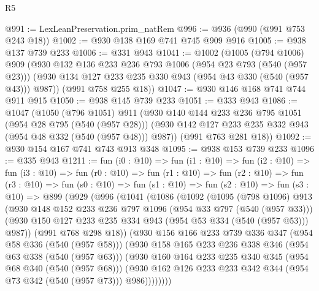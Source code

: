 \begin{lexlean}{R5}
\begin{coremodule}
@991 := LexLeanPreservation.prim_natRem
@996 := @936 (@990 (@991 @753 @243 @18))
@1002 := @930 @138 @169 @741 @745 @909 @916
@1005 := @938 @137 @739 @233
@1006 := @331 @943
@1041 := @1002
    (@1005
      (@794 @1006)
      @909
      (@930
        @132
        @136
        @233
        @236
        @793
        @1006
        (@954 @23 @793 (@540 (@957 @23)))
        (@930 @134 @127 @233 @235 @330 @943 (@954 @43 @330 (@540 (@957 @43))) @987))
      (@991 @758 @255 @18))
@1047 := @930 @146 @168 @741 @744 @911 @915
@1050 := @938 @145 @739 @233
@1051 := @333 @943
@1086 := @1047
    (@1050
      (@796 @1051)
      @911
      (@930
        @140
        @144
        @233
        @236
        @795
        @1051
        (@954 @28 @795 (@540 (@957 @28)))
        (@930 @142 @127 @233 @235 @332 @943 (@954 @48 @332 (@540 (@957 @48))) @987))
      (@991 @763 @281 @18))
@1092 := @930 @154 @167 @741 @743 @913 @348
@1095 := @938 @153 @739 @233
@1096 := @335 @943
@1211 := fun (i0 : @10) =>
  fun (i1 : @10) =>
  fun (i2 : @10) =>
  fun (i3 : @10) =>
  fun (r0 : @10) =>
  fun (r1 : @10) =>
  fun (r2 : @10) =>
  fun (r3 : @10) =>
  fun (s0 : @10) =>
  fun (s1 : @10) =>
  fun (s2 : @10) =>
  fun (s3 : @10) =>
  @899
    (@929
      (@996
        (@1041
          (@1086
            (@1092
              (@1095
                (@798 @1096)
                @913
                (@930
                  @148
                  @152
                  @233
                  @236
                  @797
                  @1096
                  (@954 @33 @797 (@540 (@957 @33)))
                  (@930 @150 @127 @233 @235 @334 @943 (@954 @53 @334 (@540 (@957 @53))) @987))
                (@991 @768 @298 @18))
              (@930
                @156
                @166
                @233
                @739
                @336
                @347
                (@954 @58 @336 (@540 (@957 @58)))
                (@930
                  @158
                  @165
                  @233
                  @236
                  @338
                  @346
                  (@954 @63 @338 (@540 (@957 @63)))
                  (@930
                    @160
                    @164
                    @233
                    @235
                    @340
                    @345
                    (@954 @68 @340 (@540 (@957 @68)))
                    (@930
                      @162
                      @126
                      @233
                      @233
                      @342
                      @344
                      (@954 @73 @342 (@540 (@957 @73)))
                      @986))))))))

\end{coremodule}
\end{lexlean}
